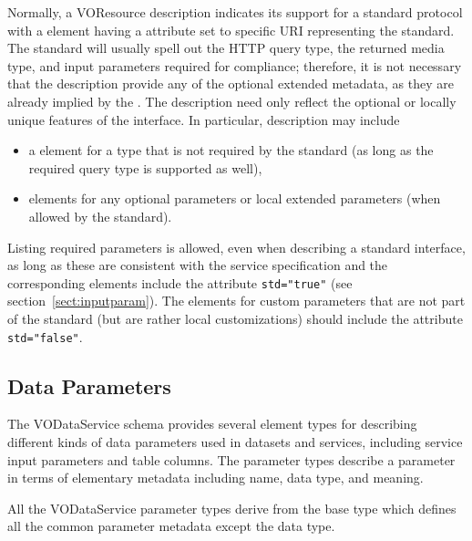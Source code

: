 \documentclass[11pt,a4paper]{ivoa}
\begin{document}
Normally, a VOResource
description indicates its support for a standard protocol with a
 element having a
 attribute set to specific URI representing the
standard.  The standard will usually spell out the HTTP query type,
the returned media type, and input parameters required for compliance;
therefore, it is not necessary that the 
description provide any of the optional extended metadata, as they are
already implied by the .  The description need
only reflect the optional or locally unique features of the
interface.  In particular, description may include


\begin{itemize}
\item a  element for a type that is not
  required by the standard (as long as the required query type is
  supported as well),

\item {}\/ elements for any optional parameters
       or local extended parameters (when allowed by the standard).
\end{itemize}


Listing required parameters is allowed, even when
describing a standard interface, as long as these are consistent with
the service specification and the corresponding 
elements include the attribute \verb|std="true"| (see
section~\ref{sect:inputparam}).  The 
elements for custom parameters that are not part of the standard (but
are rather local customizations) should include the attribute
\verb|std="false"|.





\subsection{Data Parameters}
\label{sect:param}


The VODataService schema provides several element types for describing
different kinds of data parameters used in datasets and services,
including service input parameters and table columns.  The parameter
types describe a parameter in terms of elementary metadata
including name, data type, and meaning.  


All the VODataService parameter types derive from the base type 
 which defines all the common parameter
metadata except the data type.  
\end{document}
